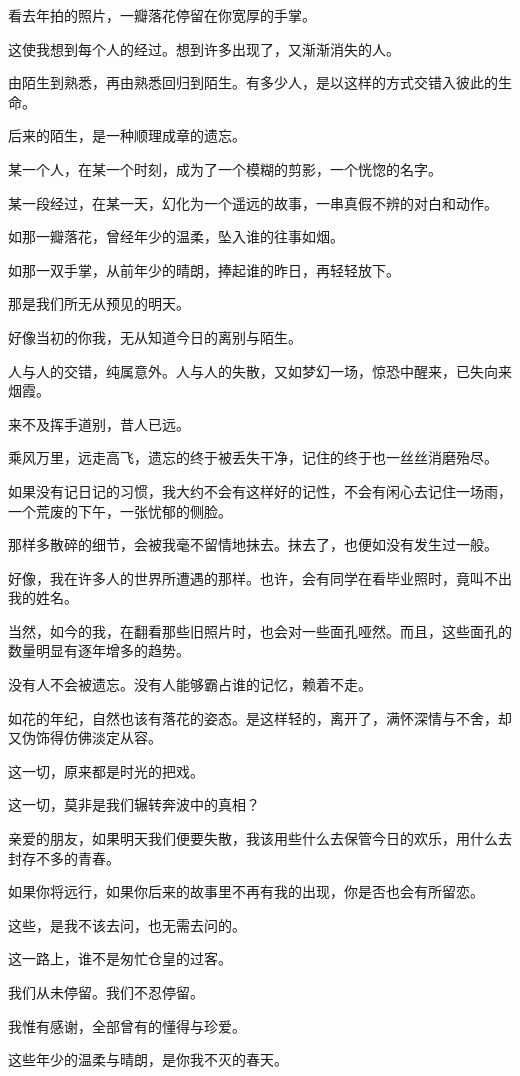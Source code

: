		看去年拍的照片，一瓣落花停留在你宽厚的手掌。\par
		这使我想到每个人的经过。想到许多出现了，又渐渐消失的人。\par
		由陌生到熟悉，再由熟悉回归到陌生。有多少人，是以这样的方式交错入彼此的生命。\par
		后来的陌生，是一种顺理成章的遗忘。\par
		某一个人，在某一个时刻，成为了一个模糊的剪影，一个恍惚的名字。\par
		某一段经过，在某一天，幻化为一个遥远的故事，一串真假不辨的对白和动作。\par
		如那一瓣落花，曾经年少的温柔，坠入谁的往事如烟。\par
		如那一双手掌，从前年少的晴朗，捧起谁的昨日，再轻轻放下。\par
		那是我们所无从预见的明天。\par
		好像当初的你我，无从知道今日的离别与陌生。\par
		人与人的交错，纯属意外。人与人的失散，又如梦幻一场，惊恐中醒来，已失向来烟霞。\par
		来不及挥手道别，昔人已远。\par
		乘风万里，远走高飞，遗忘的终于被丢失干净，记住的终于也一丝丝消磨殆尽。\par
		如果没有记日记的习惯，我大约不会有这样好的记性，不会有闲心去记住一场雨，一个荒废的下午，一张忧郁的侧脸。\par
		那样多散碎的细节，会被我毫不留情地抹去。抹去了，也便如没有发生过一般。\par
		好像，我在许多人的世界所遭遇的那样。也许，会有同学在看毕业照时，竟叫不出我的姓名。\par
		当然，如今的我，在翻看那些旧照片时，也会对一些面孔哑然。而且，这些面孔的数量明显有逐年增多的趋势。\par
		没有人不会被遗忘。没有人能够霸占谁的记忆，赖着不走。\par
		如花的年纪，自然也该有落花的姿态。是这样轻的，离开了，满怀深情与不舍，却又伪饰得仿佛淡定从容。

		这一切，原来都是时光的把戏。\par
		这一切，莫非是我们辗转奔波中的真相？\par
		亲爱的朋友，如果明天我们便要失散，我该用些什么去保管今日的欢乐，用什么去封存不多的青春。\par
		如果你将远行，如果你后来的故事里不再有我的出现，你是否也会有所留恋。\par
		这些，是我不该去问，也无需去问的。\par
		这一路上，谁不是匆忙仓皇的过客。\par
		我们从未停留。我们不忍停留。\par
		我惟有感谢，全部曾有的懂得与珍爱。\par
		这些年少的温柔与晴朗，是你我不灭的春天。


